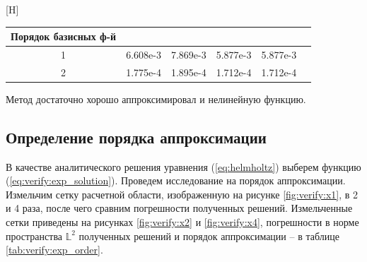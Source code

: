 \documentclass[a4paper,14pt]{article}
\makeatletter
\renewenvironment{table}[1][\fps@table]{
  \edef\@tempa{\noexpand\@float{table}[#1]}
  \@tempa
  \addtocounter{footable}{1}
}{
  \end@float
}
\makeatother
\begin{document}
\begin{table}[H]
	\caption{относительные погрешности в норме $\mathbb{L}^2$}
	\label{tab:verify:exp_diff}
	\begin{tabularx}{\textwidth}{|C{1}|C{1}|C{1}|C{1}|C{1}|C{1}|}
		\hline Порядок базисных ф-й &  &  &  &  \\
		 & 6.608e-3 & 7.869e-3 & 5.877e-3 & 5.877e-3 \\
		 & 1.775e-4 & 1.895e-4 & 1.712e-4 & 1.712e-4 \\
		\hline
	\end{tabularx}
\end{table}
\vspace{-0.5cm}Метод достаточно хорошо аппроксимировал и нелинейную функцию.


\subsection{Определение порядка аппроксимации}

В качестве аналитического решения уравнения (\ref{eq:helmholtz}) выберем функцию (\ref{eq:verify:exp_solution}). Проведем исследование на порядок аппроксимации. Измельчим сетку расчетной области, изображенную на рисунке \ref{fig:verify:x1}, в 2 и 4 раза, после чего сравним погрешности полученных решений. Измельченные сетки приведены на рисунках \ref{fig:verify:x2} и \ref{fig:verify:x4}, погрешности в норме пространства $\mathbb{L}^2$ полученных решений и порядок аппроксимации -- в таблице \ref{tab:verify:exp_order}.
\end{document}
